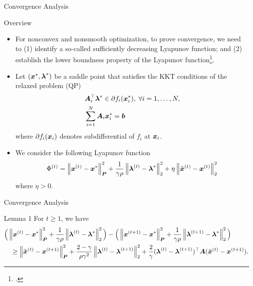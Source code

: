 \documentclass[9pt]{beamer}
\begin{document}
\begin{frame}{Convergence Analysis}

\begin{block}{Overview}
\begin{itemize}
\item For nonconvex and nonsmooth optimization, to prove convergence, we need to (1) identify a so-called sufficiently decreasing Lyapunov function; and (2) establish the lower boundness property of the Lyapunov function\footcite{yang2022proximal}.
\item Let $(\boldsymbol{x}^{*}, \boldsymbol{\lambda}^{*})$ be a saddle point that satisfies the KKT conditions of the relaxed problem (QP)
\begin{equation}
\begin{split}
& \boldsymbol{A}_i^\top \boldsymbol{\lambda}^{*} \in \partial f_i(\boldsymbol{x}_i^{*}),\; \forall i = 1, \dots, N, \\
& \sum_{i=1}^N \boldsymbol{A}_{i} \boldsymbol{x}^{*}_i = \boldsymbol{b}
\end{split}
\end{equation}
where $\partial f_i(\boldsymbol{x}_i)$ denotes subdifferential of $f_i$ at $\boldsymbol{x}_i$.
\item We consider the following Lyapunov function
\begin{equation}
\label{eq:Lya-fcn}
\Phi^{(t)} = \left\lVert \boldsymbol{x}^{(t)}-\boldsymbol{x}^{*} \right\rVert^2_{\boldsymbol{P}}
+ \frac{1}{\gamma \rho} \left\lVert \boldsymbol{\lambda}^{(t)}-\boldsymbol{\lambda}^{*} \right\rVert_2^2
+ \eta \left\lVert \Tilde{\boldsymbol{x}}^{(t)} - \boldsymbol{x}^{(t)} \right\rVert_2^2
\end{equation}
where $\eta > 0$.
\end{itemize}
\end{block}    
\end{frame}

\begin{frame}{Convergence Analysis}
\begin{block}{Lemma 1}
For $t \ge 1$, we have
\begin{equation}
\label{eq:lem1a}
\begin{multlined}
\Big( \norm{\bbsym{x}^{(t)}-\bbsym{x}^{*}}^2_{\bbsym{P}}
+ \frac{1}{\gamma \rho} \norm{\bbsym{\lambda}^{(t)}-\bbsym{\lambda}^{*}}_2^2 \Big) 
- \Big(\norm{\bbsym{x}^{(t+1)}-\bbsym{x}^{*}}^2_{\bbsym{P}}
+ \frac{1}{\gamma \rho} \norm{\bbsym{\lambda}^{(t+1)}-\bbsym{\lambda}^{*}}_2^2 \Big) \\
\ge \norm{\xtil^{(t)}-\bbsym{x}^{(t+1)}}_{\bbsym{P}}^2
+ \frac{2-\gamma}{\rho \gamma^2} \norm{\bbsym{\lambda}^{(t)}-\bbsym{\lambda}^{(t+1)}}_2^2 
+ \frac{2}{\gamma} (\bbsym{\lambda}^{(t)}-\bbsym{\lambda}^{(t+1)})^\top \bbsym{A} (\xtil^{(t)}-\bbsym{x}^{(t+1)}).
\end{multlined}
\end{equation}
\end{block}

\end{frame}
\end{document}
